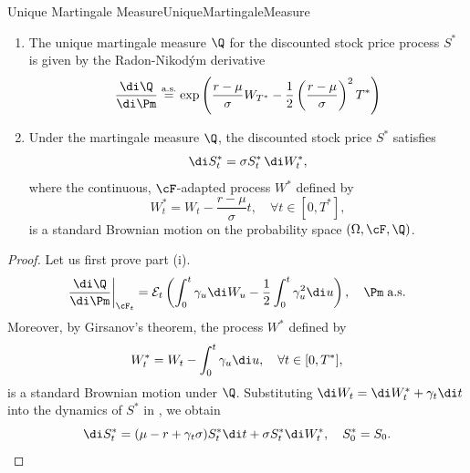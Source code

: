 \begin{lem}{Unique Martingale Measure}{UniqueMartingaleMeasure}
	\begin{enumerate}[label=(\roman*), nosep, wide]
		\item The unique martingale measure $\Q$ for the discounted stock price process $S^*$ is given by the Radon-Nikod\'ym derivative
		      \begin{equation}
			      \frac{\di \Q}{\di \Pm} \overset{\text{a.s.}}{=} \exp \left( \frac{r - \mu}{\sigma} W_{T^*} - \frac{1}{2} \left( \frac{r - \mu}{\sigma} \right)^2 T^* \right)
			      \label{eq:RadonNikodymDerivative}
		      \end{equation}
		\item Under the martingale measure $\Q$, the discounted stock price $S^*$ satisfies
		      \begin{equation}
			      \di S^*_t = \sigma S^*_t \, \di W^*_t,
			      \label{eq:DiscountedDynamicsQ}
		      \end{equation}
		      where the continuous, $\cF$-adapted process $W^*$ defined by
		      \begin{equation}
			      W^*_t = W_t - \frac{r - \mu}{\sigma} t, \quad \forall t \in [0, T^*],
			      \label{eq:GirsanovBrownianMotion}
		      \end{equation}
		      is a standard Brownian motion on the probability space $(\Omega, \cF, \Q)$.
	\end{enumerate}
\end{lem}

\begin{proof}
	Let us first prove part (i).
	\begin{equation*}
		\frac{\di \Q}{\di \Pm}\bigg|_{\cF_t} = \mathcal{E}_t\left( \int_0^t \gamma_u \di W_u - \frac{1}{2} \int_0^t \gamma_u^2 \di u \right), \quad \Pm \; \text{a.s.}
	\end{equation*}
	Moreover, by Girsanov's theorem, the process $W^*$ defined by
	\begin{equation*}
		W^*_t = W_t - \int_0^t \gamma_u \di u, \quad \forall t \in [0, T^*],
	\end{equation*}
	is a standard Brownian motion under $\Q$.
	Substituting $\di W_t = \di W^*_t + \gamma_t \di t$ into the dynamics of $S^*$ in , we obtain
	\begin{equation*}
		\di S^*_t = (\mu - r + \gamma_t \sigma) S^*_t \di t + \sigma S^*_t \di W^*_t, \quad S_0^*=S_0.
	\end{equation*}
\end{proof}

